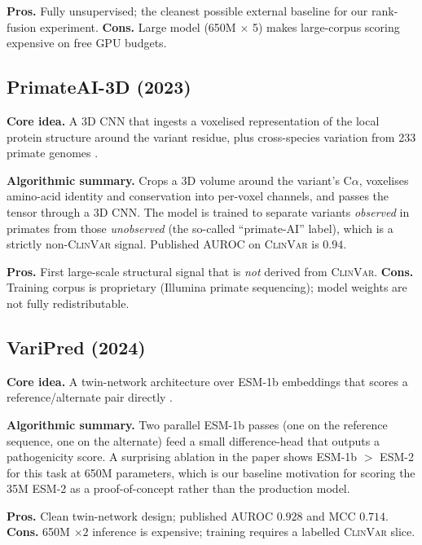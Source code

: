 \documentclass[11pt,a4paper,oneside]{report}
\begin{document}
\textbf{Pros.} Fully unsupervised; the cleanest possible external
baseline for our rank-fusion experiment. \textbf{Cons.} Large model
(650M $\times$ 5) makes large-corpus scoring expensive on free GPU
budgets.

\subsection{PrimateAI-3D (2023) \texorpdfstring{\citep{gao2023primateai3d}}{(Gao et al., 2023)}}
\label{sec:rw-primateai3d}

\textbf{Core idea.} A 3D CNN that ingests a voxelised representation
of the local protein structure around the variant residue, plus
cross-species variation from 233 primate genomes
\citep{gao2023primateai3d}.

\textbf{Algorithmic summary.} Crops a 3D volume around the variant's
$\text{C}\alpha$, voxelises amino-acid identity and conservation into
per-voxel channels, and passes the tensor through a 3D CNN. The
model is trained to separate variants \emph{observed} in primates
from those \emph{unobserved} (the so-called ``primate-AI'' label),
which is a strictly non-\textsc{ClinVar} signal. Published AUROC on
\textsc{ClinVar} is $0.94$.

\textbf{Pros.} First large-scale structural signal that is \emph{not}
derived from \textsc{ClinVar}. \textbf{Cons.} Training corpus is
proprietary (Illumina primate sequencing); model weights are not
fully redistributable.

\subsection{VariPred (2024) \texorpdfstring{\citep{lin2024varipred}}{(Lin et al., 2024)}}
\label{sec:rw-varipred}

\textbf{Core idea.} A twin-network architecture over ESM-1b embeddings
that scores a reference/alternate pair directly
\citep{lin2024varipred}.

\textbf{Algorithmic summary.} Two parallel ESM-1b passes (one on the
reference sequence, one on the alternate) feed a small
difference-head that outputs a pathogenicity score. A surprising
ablation in the paper shows ESM-1b $>$ ESM-2 for this task at 650M
parameters, which is our baseline motivation for scoring the 35M
ESM-2 as a proof-of-concept rather than the production model.

\textbf{Pros.} Clean twin-network design; published AUROC $0.928$ and
MCC $0.714$. \textbf{Cons.} 650M $\times 2$ inference is expensive;
training requires a labelled \textsc{ClinVar} slice.
\end{document}
